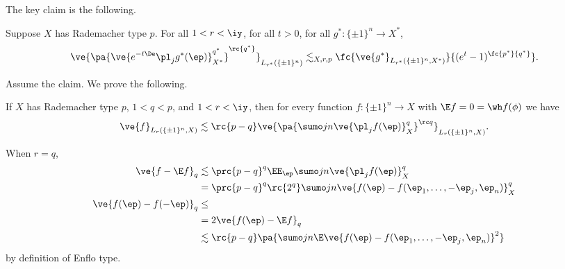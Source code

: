 The key claim is the following. 
\begin{clm}
Suppose $X$ has Rademacher type $p$. 
For all $1<r<\iy$, for all $t>0$, for all $g^*:\{\pm 1\}^n\to X^*$, 
\[
\ve{\pa{\ve{e^{-t\De} \pl_j g^*(\ep)}_{X^*}^{q^*}}^{\rc{ q^*}}}_{L_{r^*}(\{\pm 1\}^n)}\lesssim_{X,r,p} \fc{\ve{g^*}_{L_{r^*}(\{\pm 1\}^n, X^*)}}{(e^t-1)^{\fc{p^*}{q^*}}}
.
\]
\end{clm}
Assume the claim. We prove the following.
\begin{clm}
If $X$ has Rademacher type $p$, $1<q<p$, and $1<r<\iy$, then for every function $f:\{\pm 1\}^n \to X$ with $\E f = 0 = \wh f(\phi)$ we have 
\[
\ve{f}_{L_r(\{\pm 1\}^n, X)} \lesssim \rc{p-q} \ve{
\pa{\sumo jn \ve{\pl_j f(\ep)}_X^q
}^{\rc q}}_{L_r(\{\pm 1\}^n, X)}.
\]
\end{clm}
When $r=q$, 
\begin{align}
\ve{f-\E f}_q&\lesssim \prc{p-q}^q \EE_{\ep} \sumo jn \ve{\pl_j f(\ep)}_X^q\\
&= \prc{p-q}^q \rc{2^q} \sumo jn \ve{f(\ep)-f(\ep_1,\ldots, -\ep_j, \ep_n)}_X^q\\
\ve{f(\ep)-f(-\ep)}_q&\le %
\\
&= 2\ve{f(\ep)-\E f}_q\\
&\lesssim \rc{p-q} \pa{\sumo jn \E\ve{f(\ep) - f(\ep_1,\ldots, -\ep_j, \ep_n)}^2}
\end{align}
by definition of Enflo type.


